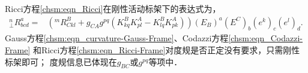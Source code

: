 Ricci方程\eqref{chsm:eqn_Ricci}在刚性活动标架下的表达式为，
\setlength{\mathindent}{0em}
\begin{equation}\label{chsm:eqn_Ricci-Frame}
    \begin{aligned}
        {}^{n}_{\bot}{R}^a_{bcd}
        =& \left({}^{m}{R}^B_{C kl} + g_{CA} g^{pq} (K^B_{kq}K^A_{pl}
        - K^B_{lq} K^A_{pk}) \right) (E_B)^a (E^C)_b (e^k)_c (e^l)_d .
    \end{aligned}
\end{equation}\setlength{\mathindent}{2em}
Gauss方程\eqref{chsm:eqn_curvature-Gauss-Frame}、Codazzi方程\eqref{chsm:eqn_Codazzi-Frame}
和Ricci方程\eqref{chsm:eqn_Ricci-Frame}对度规是否正定没有要求，只需刚性标架即可；
度规信息已体现在$g_{BC}$或$g^{pq}$等项中．






